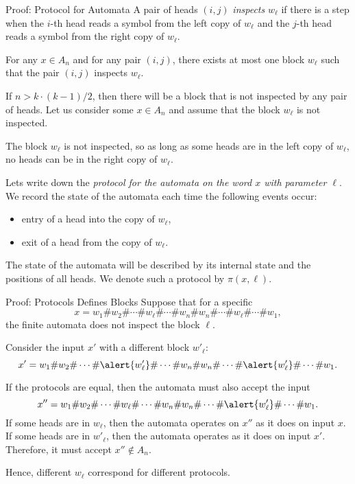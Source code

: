 \documentclass[aspectratio=169]{beamer}
\begin{document}
\begin{frame}{Proof: Protocol for Automata}
    A pair of heads $(i,j)$ \emph{inspects} $w_\ell$ if there is a step when the $i$-th head reads a symbol from the left copy of $w_\ell$ and the $j$-th head reads a symbol from the right copy of $w_\ell$.\medskip\pause

    For any $x \in A_n$ and for any pair $(i,j)$, there exists at most one block $w_\ell$ such that the pair $(i,j)$ inspects $w_\ell$. \medskip\pause

    If $n > k \cdot (k-1)/2$, then there will be a block that is not inspected by any pair of heads. Let us consider some $x \in A_n$ and assume that the block $w_\ell$ is not inspected.\medskip\pause

    The block $w_\ell$ is not inspected, so as long as some heads are in the left copy of $w_\ell$, no heads can be in the right copy of $w_\ell$.\medskip\pause

    Lets write down the \emph{protocol for the automata on the word $x$ with parameter $\ell$}.\\
    We record the state of the automata each time the following events occur:
    \begin{itemize}
        \item entry of a head into the copy of $w_\ell$,
        \item exit of a head from the copy of $w_\ell$.
    \end{itemize}
    The state of the automata will be described by its internal state and the positions of all heads. We denote such a protocol by $\pi(x,\ell)$.

\end{frame}

\begin{frame}{Proof: Protocols Defines Blocks}
    Suppose that for a specific
\[
    x = w_1\#w_2\#\dotsb\#w_\ell\#\dotsb\#w_n\#w_n\#\dotsb\#w_\ell\#\dotsb\#w_1,
\]
the finite automata does not inspect the block $\ell$.

Consider the input $x'$ with a different block $w'_\ell$:
\[
x' = w_1\#w_2\#\dotsb\#\alert{w'_\ell}\#\dotsb\#w_n\#w_n\#\dotsb\#\alert{w'_\ell}\#\dotsb\#w_1.
\]

If the protocols are equal, then the automata must also accept the input
\[
x'' = w_1\#w_2\#\dotsb\#w_\ell\#\dotsb\#w_n\#w_n\#\dotsb\#\alert{w'_\ell}\#\dotsb\#w_1.
\]
If some heads are in $w_\ell$, then the automata operates on $x''$ as it does on input $x$. If some heads are in $w'_\ell$, then the automata operates as it does on input $x'$. Therefore, it must accept $x'' \not\in A_n$.

Hence, different $w_\ell$ correspond for different protocols.
\end{frame}
\end{document}
